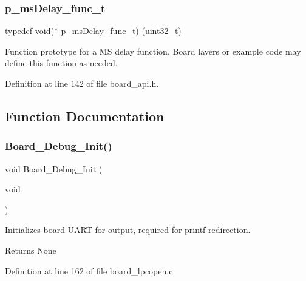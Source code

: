 \subsubsection{\texorpdfstring{p\+\_\+ms\+Delay\+\_\+func\+\_\+t}{p\_msDelay\_func\_t}}
{\footnotesize\ttfamily typedef void($\ast$ p\+\_\+ms\+Delay\+\_\+func\+\_\+t) (uint32\+\_\+t)}



Function prototype for a MS delay function. Board layers or example code may define this function as needed. 



Definition at line 142 of file board\+\_\+api.\+h.



\subsection{Function Documentation}
\mbox{\label{group___b_o_a_r_d___c_o_m_m_o_n___a_p_i_gabcba073f50ad637ee6bc852f64ea2ce6}} 
\subsubsection{\texorpdfstring{Board\+\_\+\+Debug\+\_\+\+Init()}{Board\_Debug\_Init()}}
{\footnotesize\ttfamily void Board\+\_\+\+Debug\+\_\+\+Init (\begin{DoxyParamCaption}\item[{void}]{ }\end{DoxyParamCaption})}



Initializes board U\+A\+RT for output, required for printf redirection. 

\begin{DoxyReturn}{Returns}
None 
\end{DoxyReturn}


Definition at line 162 of file board\+\_\+lpcopen.\+c.

\mbox{\label{group___b_o_a_r_d___c_o_m_m_o_n___a_p_i_gae8d2d761b984f48c3dbb27dd32a8c119}} 
